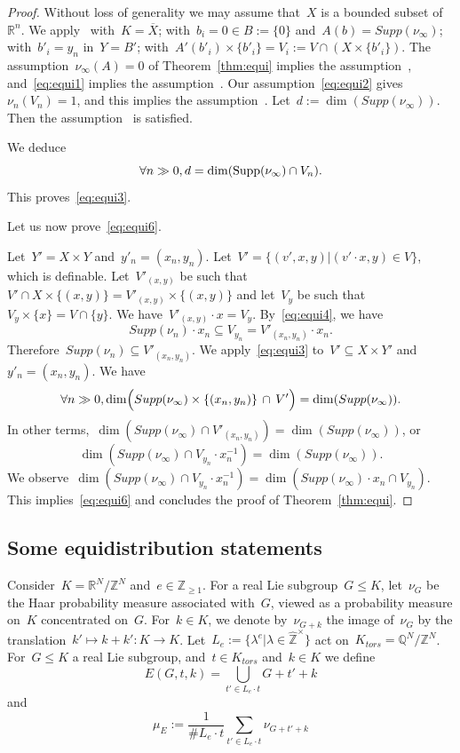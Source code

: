 \documentclass[12pt]{amsart}
\newcommand{\Supp}{{\rm Supp}}
\newcommand{\R}{{\mathbb R}}
\newcommand{\Z}{{\mathbb Z}}
\newcommand{\Q}{{\mathbb Q}}
\newcommand{\ol}{\overline}
\newcommand{\wh}{\widehat}
\begin{document}
\begin{proof}Without loss of generality we may assume that~$X$ is a bounded subset of~$\R^n$.
We apply~\cite[Th.~4.3, Cor.~4.4]{RU} with~$K=\ol{X}$; with~$b_i=0\in B:=\{0\}$ and~$A(b)=Supp(\nu_\infty)$; with~$b'_i=y_n$ in~$Y=B'$; with~$A'(b'_i)\times \{b'_i\}=V_i:=V\cap \left(X\times \{b'_i\}\right)$. The assumption~$\nu_\infty(A)=0$ of Theorem~\ref{thm:equi} implies the assumption~\cite[(4.3)]{RU}, and~\eqref{eq:equi1} implies the assumption~\cite[(4.3)]{RU}. Our assumption~\eqref{eq:equi2} gives~$\nu_n(V_n)=1$, and this implies the assumption~\cite[(4.4)]{RU}. Let~$d:=\dim(Supp(\nu_\infty))$. Then the assumption~\cite[(4.4)]{RU} is satisfied.

We deduce
\[
\forall n\gg0, d=\dim(\Supp(\nu_\infty)\cap V_n).
\]
This proves~\eqref{eq:equi3}.

Let us now prove~\eqref{eq:equi6}.

Let~$Y'=X\times Y$ and~$y'_n=(x_n,y_n)$. Let~$V'=\{(v',x,y)|(v'\cdot x,y)\in V\}$, which is definable. Let~$V'_{(x,y)}$ be such that~$V'\cap X\times \{(x,y)\}=V'_{(x,y)}\times \{(x,y)\}$ and let~$V_y$ be such that~$V_y\times\{x\}=V\cap \{y\}$. We have~$V'_{(x,y)}\cdot x=V_y$. By~\eqref{eq:equi4}, we have
\[
Supp(\nu_n)\cdot x_n\subseteq V_{y_n}= V'_{(x_n,y_n)}\cdot x_n.
\]
Therefore~$Supp(\nu_n)\subseteq V'_{(x_n,y_n)}$. 
We apply~\eqref{eq:equi3} to~$V'\subseteq X\times Y'$ and~$y'_n=(x_n,y_n)$. We have
\begin{equation}
\forall n\gg0, \dim\Bigl(Supp(\nu_\infty)\times\{(x_n,y_n)\}\,\cap\,V'\Bigr)=\dim(Supp(\nu_\infty)).
\end{equation}
In other terms,~$\dim(Supp(\nu_\infty)\cap V'_{(x_n,y_n)})=\dim(Supp(\nu_\infty))$, or
\[
\dim(Supp(\nu_\infty)\cap V_{y_n}\cdot x_n^{-1})=\dim(Supp(\nu_\infty)).
\]
We observe~$\dim(Supp(\nu_\infty)\cap V_{y_n}\cdot x_n^{-1})=\dim(Supp(\nu_\infty)\cdot x_n\cap V_{y_n})$. This implies~\eqref{eq:equi6} and concludes the proof of Theorem~\ref{thm:equi}.
\end{proof}

\subsection{Some equidistribution statements}\label{sec:31}

Consider~$K=\R^N/\Z^N$ and~$e\in\Z_{\geq1}$.
For a real Lie subgroup~$G\leq K$, let~$\nu_{G}$ be the Haar probability measure associated with~$G$, viewed as a probability measure on~$K$ concentrated on~$G$. For~$k\in K$, we denote by~$\nu_{G+k}$ the image of~$\nu_G$ by the translation~$k'\mapsto k+k':K\to K$. Let~$L_e:=\{\lambda^e|\lambda\in\wh{\Z}^{\times}\}$ act on~$K_{tors}=\Q^N/\Z^N$. For~$G\leq K$ a real Lie subgroup, and~$t\in K_{tors}$ and~$k\in K$ we define
\[
E(G,t,k)=\bigcup_{t'\in L_e\cdot t} G+t'+k
\]
and
\[
\mu_E:=\frac{1}{\#L_e\cdot t}\sum_{t'\in L_e\cdot t} \nu_{G+t'+k}
\]
\end{document}
